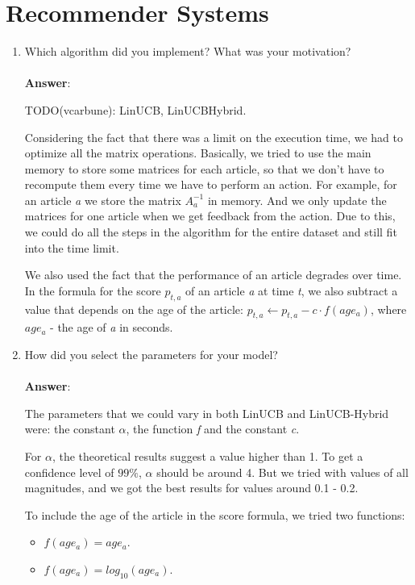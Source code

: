 \documentclass[11pt]{article}
\begin{document}
\begin{enumerate}
\begin{itemize}
\end{itemize}

\end{enumerate}

\section{Recommender Systems}

\begin{enumerate}
\item Which algorithm did you implement? What was your motivation? \\ \\
\textbf{Answer}:

TODO(vcarbune): LinUCB, LinUCBHybrid.


Considering the fact that there was a limit on the execution time, we had to 
optimize all the matrix operations. Basically, we tried to use the main memory to store
some matrices for each article, so that we don't have to recompute them every time we
have to perform an action. For example, for an article \emph{a} we store the matrix
$A_a ^ {-1}$ in memory. And we only update the matrices for one article when we get 
feedback from the action. Due to this, we could do all the steps in the algorithm for
the entire dataset and still fit into the time limit. 

We also used the fact that the performance of an article degrades over time. 
In the formula for the score $p_{t,a}$ of an article \emph{a} at time \emph{t}, we also
subtract a value that depends on the age of the article: 
$p_{t,a} \gets p_{t,a} - c \cdot f(age_a)$, 
where $age_a$ - the age of \emph{a} in seconds.

\item How did you select the parameters for your model? \\ \\
\textbf{Answer}:

The parameters that we could vary in both LinUCB and LinUCB-Hybrid were: 
the constant $\alpha$, the function \emph{f} and the constant \emph{c}.

For $\alpha$, the theoretical results suggest a value higher than 1. To get a confidence
level of $99\%$, $\alpha$ should be around 4. 
But we tried with values of all magnitudes, and we got the best results for values around
0.1 - 0.2.

To include the age of the article in the score formula, we tried two functions: 
\begin{itemize}
    \item $f(age_a) = age_a$.
    \item $f(age_a) = log_{10}(age_a)$.
\end{itemize}


\end{enumerate}
\end{document}
